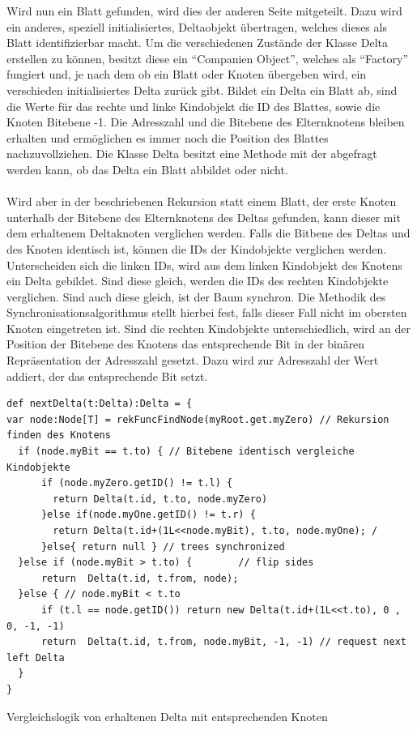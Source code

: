 \documentclass[a4paper,11pt,oneside,%
headsepline,												%
footsepline,												%
bibtotocnumbered									%
]{scrreprt}
\begin{document}
Wird nun ein Blatt gefunden, wird dies der anderen Seite mitgeteilt. Dazu wird ein anderes, speziell initialisiertes, Deltaobjekt übertragen, welches dieses als Blatt identifizierbar macht. Um die verschiedenen Zustände der Klasse Delta erstellen zu können, besitzt diese ein \enquote{Companien Object}, welches als \enquote{Factory} fungiert und, je nach dem ob ein Blatt oder Knoten übergeben wird, ein verschieden initialisiertes Delta zurück gibt. Bildet ein Delta ein Blatt ab, sind die Werte für das rechte und linke Kindobjekt die ID des Blattes, sowie die Knoten Bitebene -1. Die Adresszahl und die Bitebene des Elternknotens bleiben erhalten und ermöglichen es immer noch die Position des Blattes nachzuvollziehen. Die Klasse Delta besitzt eine Methode mit der abgefragt werden kann, ob das Delta ein Blatt abbildet oder nicht.\\\\
Wird aber in der beschriebenen Rekursion statt einem Blatt, der erste Knoten unterhalb der Bitebene des Elternknotens des Deltas gefunden, kann dieser mit dem erhaltenem Deltaknoten verglichen werden. Falls die Bitbene des Deltas und des Knoten identisch ist, können die IDs der Kindobjekte verglichen werden. Unterscheiden sich die linken IDs, wird aus dem linken Kindobjekt des Knotens ein Delta gebildet. Sind diese gleich, werden die IDs des rechten Kindobjekte verglichen. Sind auch diese gleich, ist der Baum synchron. Die Methodik des Synchronisationsalgorithmus stellt hierbei fest, falls dieser Fall nicht im obersten Knoten eingetreten ist. Sind die rechten Kindobjekte unterschiedlich, wird an der Position der Bitebene des Knotens das entsprechende Bit in der binären Repräsentation der Adresszahl gesetzt. Dazu wird zur Adresszahl der Wert addiert, der das entsprechende Bit setzt.\\
\begin{listing}[H]
	\begin{verbatim}
def nextDelta(t:Delta):Delta = {
var node:Node[T] = rekFuncFindNode(myRoot.get.myZero) // Rekursion finden des Knotens
  if (node.myBit == t.to) { // Bitebene identisch vergleiche Kindobjekte
      if (node.myZero.getID() != t.l) {
        return Delta(t.id, t.to, node.myZero)
      }else if(node.myOne.getID() != t.r) {
        return Delta(t.id+(1L<<node.myBit), t.to, node.myOne); /
      }else{ return null } // trees synchronized
  }else if (node.myBit > t.to) {        // flip sides
      return  Delta(t.id, t.from, node); 
  }else { // node.myBit < t.to
      if (t.l == node.getID()) return new Delta(t.id+(1L<<t.to), 0 , 0, -1, -1)
      return  Delta(t.id, t.from, node.myBit, -1, -1) // request next left Delta
  }
}
	\end{verbatim}
	\caption{Vergleichslogik von erhaltenen Delta mit entsprechenden Knoten}
	\label{lst:DeltaComp}
\end{listing}
\end{document}
